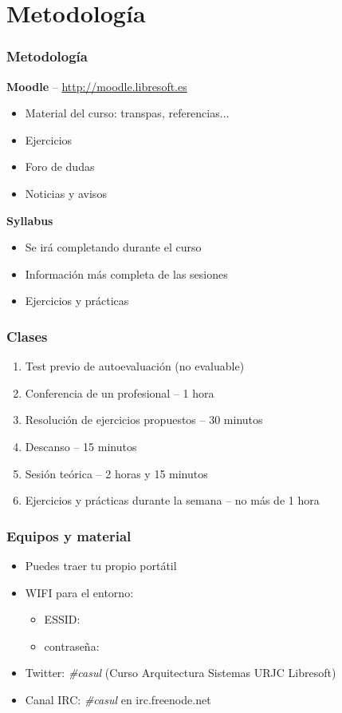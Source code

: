 \documentclass{beamer}
\begin{document}
\section{Metodología}
\begin{frame}
  \frametitle{Metodología}
  \begin{center}
    \textbf{Moodle} -- \url{http://moodle.libresoft.es}
  \end{center}
  \begin{itemize}
    \item Material del curso: transpas, referencias...
    \item Ejercicios
    \item Foro de dudas
    \item Noticias y avisos
  \end{itemize}
  \vspace{0.15cm}
  \begin{center}
    \textbf{Syllabus}\\
  \end{center}
  \begin{itemize}
    \item Se irá completando durante el curso
    \item Información más completa de las sesiones
    \item Ejercicios y prácticas
  \end{itemize}
\end{frame}

\begin{frame}
  \frametitle{Clases}
  \begin{enumerate}
    \item Test previo de autoevaluación {\small (no evaluable)}
    \item Conferencia de un profesional -- {\small 1 hora}
    \item Resolución de ejercicios propuestos -- {\small 30 minutos}
    \item Descanso -- {\small 15 minutos}
    \item Sesión teórica -- {\small 2 horas y 15 minutos}
    \item Ejercicios y prácticas durante la semana -- {\small no más de 1 hora}
  \end{enumerate}
\end{frame}

\begin{frame}
  \frametitle{Equipos y material}
  \begin{itemize}
    \item Puedes traer tu propio portátil
    \item WIFI para el entorno:
      \begin{itemize}
        \item ESSID:   
        \item contraseña: 
      \end{itemize}
    \item Twitter: \textit{\#casul} {\small (Curso Arquitectura Sistemas URJC Libresoft)}
    \item Canal IRC: \textit{\#casul} en irc.freenode.net
  \end{itemize}
\end{frame}
\end{document}

